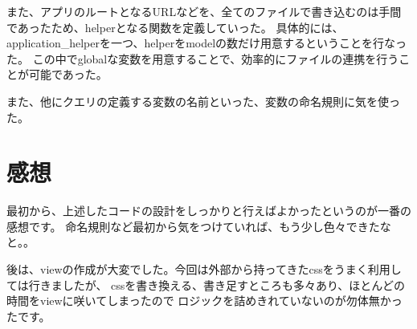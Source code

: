 \documentclass[11pt,a4j]{jsarticle}
\begin{document}
また、アプリのルートとなるURLなどを、全てのファイルで書き込むのは手間であったため、helperとなる関数を定義していった。
具体的には、application\_helperを一つ、helperをmodelの数だけ用意するということを行なった。
この中でglobalな変数を用意することで、効率的にファイルの連携を行うことが可能であった。

また、他にクエリの定義する変数の名前といった、変数の命名規則に気を使った。


\section{感想}

最初から、上述したコードの設計をしっかりと行えばよかったというのが一番の感想です。
命名規則など最初から気をつけていれば、もう少し色々できたなと。。

後は、viewの作成が大変でした。今回は外部から持ってきたcssをうまく利用しては行きましたが、
cssを書き換える、書き足すところも多々あり、ほとんどの時間をviewに咲いてしまったので
ロジックを詰めきれていないのが勿体無かったです。
\end{document}
